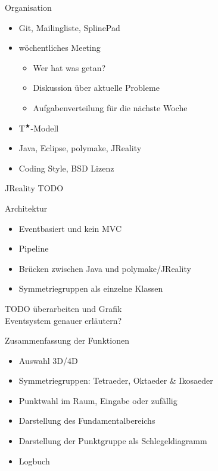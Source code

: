\documentclass[ucs,11pt]{beamer}
\begin{document}
\begin{frame}{Organisation}
		\begin{itemize}
			\item Git, Mailingliste, SplinePad \pause
			\item wöchentliches Meeting \pause
				\begin{itemize}
					\item Wer hat was getan?
					\item Diskussion über aktuelle Probleme
					\item Aufgabenverteilung für die nächste Woche
				\end{itemize} \pause
			\item T$^\bigstar$-Modell \pause
			\item Java, Eclipse, polymake, JReality \pause
			\item Coding Style, BSD Lizenz
		\end{itemize}
\end{frame}

\begin{frame}{JReality}
TODO
\end{frame}


\begin{frame}{Architektur}
	\begin{itemize}
		\item Eventbasiert und kein MVC \pause
		\item Pipeline \pause
		\item Brücken zwischen Java und polymake/JReality \pause
		\item Symmetriegruppen als einzelne Klassen
	\end{itemize}
TODO überarbeiten und Grafik \\
Eventsystem genauer erläutern?
\end{frame}

\begin{frame}{Zusammenfassung der Funktionen}
	\begin{itemize}
		\item Auswahl 3D/4D \pause
		\item Symmetriegruppen: Tetraeder, Oktaeder \& Ikosaeder \pause
		\item Punktwahl im Raum, Eingabe oder zufällig \pause
		\item Darstellung des Fundamentalbereichs \pause
		\item Darstellung der Punktgruppe als Schlegeldiagramm \pause
		\item Logbuch 	
	\end{itemize}
\end{frame}
\end{document}
